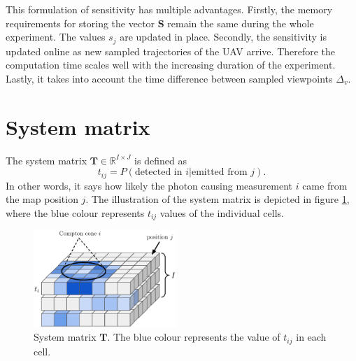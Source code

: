 This formulation of sensitivity has multiple advantages.
Firstly, the memory requirements for storing the vector $\mathbf{S}$ remain the same during the whole experiment. The values $s_{j}$ are updated in place.
Secondly, the sensitivity is updated online as new sampled trajectories of the \ac{UAV} arrive. Therefore the computation time scales well with the increasing duration of the experiment.
Lastly, it takes into account the time difference between sampled viewpoints $\Delta_{v}$.%

\section{System matrix}
\label{sec:system}
The system matrix $\mathbf{T} \in \mathbb{R}^{I \times J}$ is defined as
\begin{equation}
t_{ij} =  P(\textrm{detected in } i | \textrm{emitted from } j).
\end{equation}
In other words, it says how likely the photon causing measurement $i$ came from the map position $j$.
The illustration of the system matrix is depicted in figure \ref{fig:sys_ilustration}, where the blue colour represents $t_{ij}$ values of the individual cells. 
\begin{figure}[!h]
  \centering
    \includegraphics[width=0.48\textwidth]{./fig/photos/systemmmm.eps}
  \caption{System matrix $\mathbf{T}$. The blue colour represents the value of $t_{ij}$ in each cell.}
    \label{fig:sys_ilustration}
\end{figure}


